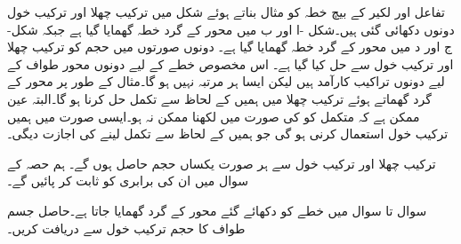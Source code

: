 \begin{figure}
\begin{subfigure}{0.45\textwidth}
\caption{}
\end{subfigure}
\caption{}
\label{شکل_تکمل_استعمال_چھلا_خول}
\end{figure}

تفاعل  اور لکیر  کے بیچ خطہ کو مثال بناتے ہوئے شکل  میں ترکیب چھلا اور ترکیب خول دونوں دکھائی  گئی ہیں۔شکل -ا اور ب میں محور  کے گرد خطہ گھمایا گیا ہے جبکہ شکل-ج اور د میں محور  کے گرد خطہ گھمایا گیا ہے۔ دونوں صورتوں میں حجم کو ترکیب چھلا اور ترکیب خول سے حل کیا گیا ہے۔ اس مخصوص خطے کے لیے دونوں محور طواف کے لیے دونوں تراکیب کارآمد ہیں لیکن ایسا ہر  مرتبہ نہیں ہو گا۔مثال کے طور پر محور  کے گرد گھماتے ہوئے ترکیب چھلا میں ہمیں  کے لحاظ سے تکمل حل کرنا ہو گا۔البتہ عین ممکن ہے کہ متکمل کو  کی صورت میں لکھنا ممکن نہ ہو۔ایسی صورت میں ہمیں ترکیب خول استعمال کرنی ہو گی جو ہمیں  کے لحاظ سے تکمل لینے کی اجازت دیگی۔

ترکیب چھلا اور ترکیب خول سے ہر صورت  یکساں  حجم حاصل ہوں گے۔ ہم حصہ  کے سوال  میں ان کی برابری  کو ثابت کر پائیں گے۔


سوال  تا سوال  میں خطے کو دکھائے گئے محور کے گرد گھمایا جاتا ہے۔حاصل جسم طواف کا حجم ترکیب خول سے دریافت کریں۔

